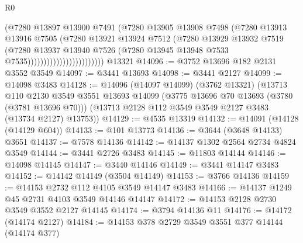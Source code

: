 \begin{lexlean}{R0}
\begin{coremodule}
                                      (@7280
                                        @13897
                                        @13900
                                        @7491
                                        (@7280
                                          @13905
                                          @13908
                                          @7498
                                          (@7280
                                            @13913
                                            @13916
                                            @7505
                                            (@7280
                                              @13921
                                              @13924
                                              @7512
                                              (@7280
                                                @13929
                                                @13932
                                                @7519
                                                (@7280
                                                  @13937
                                                  @13940
                                                  @7526
                                                  (@7280
                                                    @13945
                                                    @13948
                                                    @7533
                                                    @7535))))))))))))))))))))))))
    @13321
@14096 := @3752 @13696 @182 @2131 @3552 @3549
@14097 := @3441 @13693
@14098 := @3441 @2127
@14099 := @14098 @3483
@14128 := @14096
    (@14097 @14099)
    (@3762 @13321)
    (@13713
      @110
      @2130
      @3549
      @3551
      @13693
      @14099
      (@3775 @13696 @70 @13693 (@3780 (@3781 @13696 @70)))
      (@13713 @2128 @112 @3549 @3549 @2127 @3483 (@13734 @2127) @13753))
@14129 := @4535 @13319
@14132 := @14091 (@14128 (@14129 @604))
@14133 := @101 @13773
@14136 := @3644 (@3648 @14133) @3651
@14137 := @7578 @14136
@14142 := @14137 @1302 @2564 @2734 @4824 @3549
@14144 := @3441 @2726 @3483
@14145 := @11803 @14144
@14146 := @14098 @14145
@14147 := @3440 @14146
@14149 := @3441 @14147 @3483
@14152 := @14142 @14149 (@3504 @14149)
@14153 := @3766 @14136
@14159 := @14153 @2732 @112 @4105 @3549 @14147 @3483
@14166 := @14137 @1249 @45 @2731 @4103 @3549 @14146 @14147
@14172 := @14153 @2128 @2730 @3549 @3552 @2127 @14145
@14174 := @3794 @14136 @11
@14176 := @14172 (@14174 @2127)
@14184 := @14153 @378 @2729 @3549 @3551 @377 @14144 (@14174 @377)

\end{coremodule}
\end{lexlean}
